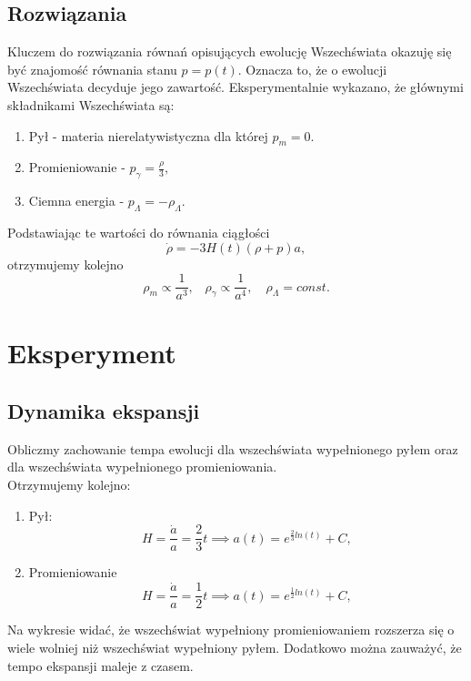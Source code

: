 \documentclass[12pt]{article}
\begin{document}
	
	\subsection{Rozwiązania}
	Kluczem do rozwiązania równań opisujących ewolucję Wszechświata okazuję się być znajomość równania stanu $p = p(t)$. Oznacza to, że o ewolucji Wszechświata decyduje jego zawartość. Eksperymentalnie wykazano, że głównymi składnikami Wszechświata są:
	\begin{enumerate}
		\item Pył - materia nierelatywistyczna dla której $p_{m}=0$. 
		
		\item Promieniowanie - $p_{\gamma} = \frac{\rho }{3}$,
		
		\item Ciemna energia - $p_{\Lambda} = - \rho_{\Lambda}$.
	\end{enumerate}
	Podstawiając te wartości do równania ciągłości 
	\begin{equation}
	\dot{\rho} = -3H(t)(\rho+p)a,
	\end{equation}
	otrzymujemy kolejno
	\begin{equation}
	\rho_{m} \propto \frac{1}{a^3},\,\,\,\,\, \rho_{\gamma} \propto \frac{1}{a^4},\,\,\,\,\,\, \rho_{\Lambda} = const.
	\end{equation}
		
	\section{Eksperyment}
	\subsection{Dynamika ekspansji}
	Obliczmy zachowanie tempa ewolucji dla wszechświata wypełnionego pyłem oraz dla wszechświata wypełnionego promieniowania.
	\\
	Otrzymujemy kolejno:
	\begin{enumerate}
		\item Pył: 
		\begin{equation}
			H = \frac{\dot{a}}{a} = \frac{2}{3} t \implies a(t) = e^{\frac{2}{3} ln(t)} + C,
		\end{equation}
		\item Promieniowanie
		\begin{equation}
			H = \frac{\dot{a}}{a} = \frac{1}{2} t \implies a(t) = e^{\frac{1}{2} ln(t)} + C,
		\end{equation}
	\end{enumerate}
	\begin{center}
	\end{center}
	Na wykresie widać, że wszechświat wypełniony promieniowaniem rozszerza się o wiele wolniej niż wszechświat wypełniony pyłem. Dodatkowo można zauważyć, że tempo ekspansji maleje z czasem.
\end{document}
